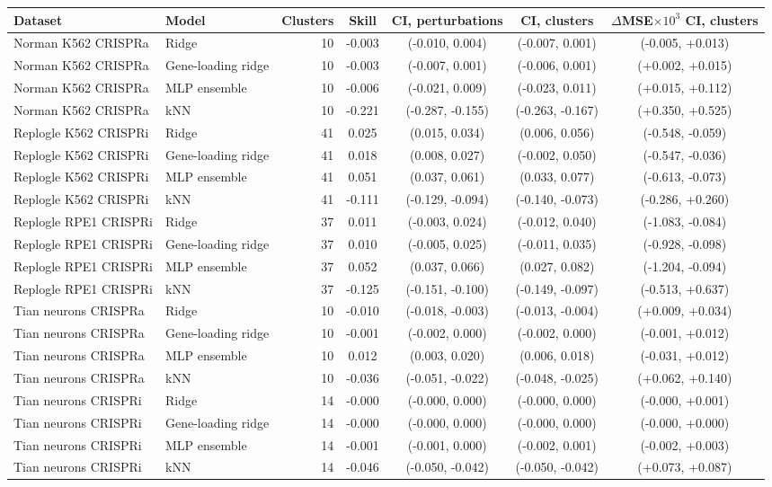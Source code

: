 \begin{tabular}{llrcccc}
\toprule
Dataset & Model & Clusters & Skill & CI, perturbations & CI, clusters & $\Delta$MSE$\times10^3$ CI, clusters \\
\midrule
Norman K562 CRISPRa & Ridge & 10 & -0.003 & (-0.010, 0.004) & (-0.007, 0.001) & (-0.005, +0.013) \\
Norman K562 CRISPRa & Gene-loading ridge & 10 & -0.003 & (-0.007, 0.001) & (-0.006, 0.001) & (+0.002, +0.015) \\
Norman K562 CRISPRa & MLP ensemble & 10 & -0.006 & (-0.021, 0.009) & (-0.023, 0.011) & (+0.015, +0.112) \\
Norman K562 CRISPRa & kNN & 10 & -0.221 & (-0.287, -0.155) & (-0.263, -0.167) & (+0.350, +0.525) \\
Replogle K562 CRISPRi & Ridge & 41 & 0.025 & (0.015, 0.034) & (0.006, 0.056) & (-0.548, -0.059) \\
Replogle K562 CRISPRi & Gene-loading ridge & 41 & 0.018 & (0.008, 0.027) & (-0.002, 0.050) & (-0.547, -0.036) \\
Replogle K562 CRISPRi & MLP ensemble & 41 & 0.051 & (0.037, 0.061) & (0.033, 0.077) & (-0.613, -0.073) \\
Replogle K562 CRISPRi & kNN & 41 & -0.111 & (-0.129, -0.094) & (-0.140, -0.073) & (-0.286, +0.260) \\
Replogle RPE1 CRISPRi & Ridge & 37 & 0.011 & (-0.003, 0.024) & (-0.012, 0.040) & (-1.083, -0.084) \\
Replogle RPE1 CRISPRi & Gene-loading ridge & 37 & 0.010 & (-0.005, 0.025) & (-0.011, 0.035) & (-0.928, -0.098) \\
Replogle RPE1 CRISPRi & MLP ensemble & 37 & 0.052 & (0.037, 0.066) & (0.027, 0.082) & (-1.204, -0.094) \\
Replogle RPE1 CRISPRi & kNN & 37 & -0.125 & (-0.151, -0.100) & (-0.149, -0.097) & (-0.513, +0.637) \\
Tian neurons CRISPRa & Ridge & 10 & -0.010 & (-0.018, -0.003) & (-0.013, -0.004) & (+0.009, +0.034) \\
Tian neurons CRISPRa & Gene-loading ridge & 10 & -0.001 & (-0.002, 0.000) & (-0.002, 0.000) & (-0.001, +0.012) \\
Tian neurons CRISPRa & MLP ensemble & 10 & 0.012 & (0.003, 0.020) & (0.006, 0.018) & (-0.031, +0.012) \\
Tian neurons CRISPRa & kNN & 10 & -0.036 & (-0.051, -0.022) & (-0.048, -0.025) & (+0.062, +0.140) \\
Tian neurons CRISPRi & Ridge & 14 & -0.000 & (-0.000, 0.000) & (-0.000, 0.000) & (-0.000, +0.001) \\
Tian neurons CRISPRi & Gene-loading ridge & 14 & -0.000 & (-0.000, 0.000) & (-0.000, 0.000) & (-0.000, +0.000) \\
Tian neurons CRISPRi & MLP ensemble & 14 & -0.001 & (-0.001, 0.000) & (-0.002, 0.001) & (-0.002, +0.003) \\
Tian neurons CRISPRi & kNN & 14 & -0.046 & (-0.050, -0.042) & (-0.050, -0.042) & (+0.073, +0.087) \\
\bottomrule
\end{tabular}